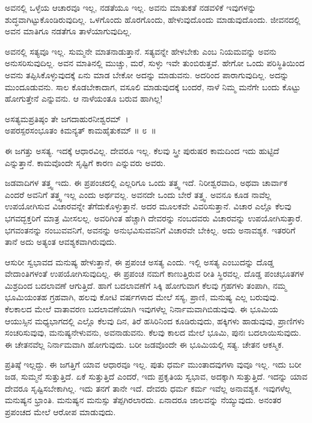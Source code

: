 ಅವನಲ್ಲಿ ಒಳ್ಳೆಯ ಆಚಾರವೂ ಇಲ್ಲ, ನಡತೆಯೂ ಇಲ್ಲ. ಅವನು ಮಾತುಕತೆ ನಡವಳಿಕೆ ಇವುಗಳನ್ನು ಶುದ್ಧವಾಗಿಟ್ಟುಕೊಂಡಿರುವುದಿಲ್ಲ. ಒಳಗೊಂದು ಹೊರಗೊಂದು, ಹೇಳುವುದೊಂದು ಮಾಡುವುದೊಂದು. ಜೀವನದಲ್ಲಿ ಅವನ ಮಾತಿಗೂ ನಡತೆಗೂ ತಾಳೆಯಾಗುವುದಿಲ್ಲ.

ಅವನಲ್ಲಿ ಸತ್ಯವೂ ಇಲ್ಲ. ಸುಮ್ಮನೇ ಮಾತನಾಡುತ್ತಾನೆ. ಸತ್ಯವನ್ನೇ ಹೇಳಬೇಕು ಎಂಬ ನಿಯಮವನ್ನು ಅವನು ಅನುಸರಿಸುವುದಿಲ್ಲ. ಅವನ ಮಾತಿನಲ್ಲಿ ಮುಚ್ಚು, ಮರೆ, ಸುಳ್ಳು ಇವೇ ತುಂಬಿರುತ್ತವೆ. ಹೇಗೋ ಒಂದು ಪರಿಸ್ಥಿತಿಯಿಂದ ಅವನು ತಪ್ಪಿಸಿಕೊಳ್ಳುವುದಕ್ಕೆ ಏನು ಮಾಡ ಬೇಕೋ ಅದನ್ನು ಮಾಡುವನು. ಅದರಿಂದ ಪಾರಾಗುವುದಿಲ್ಲ. ಅದನ್ನು ಮುಂದೂಡುವನು. ಸಾಲ ಕೊಡಬೇಕಾದಾಗ, ವಸೂಲಿ ಮಾಡುವುದಕ್ಕೆ ಬಂದರೆ, ನಾಳೆ ನಿಮ್ಮ ಮನೆಗೇ ಬಂದು ಕೊಟ್ಟು ಹೋಗುತ್ತೇನೆ ಎನ್ನುವನು. ಆ ನಾಳೆಯಂತೂ ಬರುವ ಹಾಗಿಲ್ಲ!

\begin{shloka}
ಅಸತ್ಯಮಪ್ರತಿಷ್ಠಂ ತೇ ಜಗದಾಹುರನೀಶ್ವರಮ್~।\\ಅಪರಸ್ಪರಸಂಭೂತಂ ಕಿಮನ್ಯತ್ ಕಾಮಹೈತುಕಮ್ \hfill॥ ೮~॥
\end{shloka}

\begin{artha}
ಈ ಜಗತ್ತು ಅಸತ್ಯ. ಇದಕ್ಕೆ ಆಧಾರವಿಲ್ಲ. ದೇವರೂ ಇಲ್ಲ. ಕೆಲವು ಸ್ತ್ರೀ ಪುರುಷರ ಕಾಮದಿಂದ ಇದು ಹುಟ್ಟಿದೆ ಎನ್ನುತ್ತಾನೆ. ಕಾಮವೊಂದೇ ಸೃಷ್ಟಿಗೆ ಕಾರಣ ಎನ್ನುವರು ಅವರು.
\end{artha}

ಜಡವಾದಿಗಳ ತತ್ತ್ವ ಇದು. ಈ ಪ್ರಪಂಚದಲ್ಲಿ ಎಲ್ಲರಿಗೂ ಒಂದು ತತ್ತ್ವ ಇದೆ. ನಿರೀಶ್ವರವಾದಿ, ಅಥವಾ ಚಾರ್ವಾಕ ಎಂದರೆ ಅವನಿಗೆ ತತ್ತ್ವ ಇಲ್ಲ ಎಂದು ಅರ್ಥವಲ್ಲ. ಅವನದೇ ಒಂದು ಬೇರೆ ತತ್ತ್ವ. ಅವನೂ ಕೂಡ ನಾವೆಲ್ಲ ಉಪಯೋಗಿಸುವ ವಿಚಾರವನ್ನೇ ತೆಗೆದುಕೊಳ್ಳುತ್ತಾನೆ. ಅದರ ಮೂಲಕವೇ ವಿವರಿಸುತ್ತಾನೆ. ವಿಚಾರ ಎಲ್ಲೊ ಕೆಲವು ಭಗವದ್ಭಕ್ತರಿಗೆ ಮಾತ್ರ ಮೀಸಲಲ್ಲ. ಅವರಿಗಿಂತ ಹೆಚ್ಚಾಗಿ ದೇವರನ್ನು ನಂಬದವರು ವಿಚಾರವನ್ನು ಉಪಯೋಗಿಸುತ್ತಾರೆ. ಭಗವಂತನನ್ನು ನಂಬುವವನಿಗೆ, ಅವನನ್ನು ಅನುಭವಿಸುವವನಿಗೆ ವಿಚಾರವೇ ಬೇಕಿಲ್ಲ. ಅದು ಅನಾವಶ್ಯಕ. ಇತರರಿಗೆ ತಾನೆ ಅದು ಅತ್ಯಂತ ಆವಶ್ಯಕವಾಗಿರುವುದು.

ಆಸುರೀ ಸ್ವಭಾವದ ಮನುಷ್ಯ ಹೇಳುತ್ತಾನೆ, ಈ ಪ್ರಪಂಚ ಅಸತ್ಯ ಎಂದು. ಇಲ್ಲಿ ಅಸತ್ಯ ಎಂಬುದನ್ನು ದೊಡ್ಡ ವೇದಾಂತಿಗಳಂತೆ ಉಪಯೋಗಿಸುವುದಿಲ್ಲ. ಈ ಪ್ರಪಂಚ ನಮಗೆ ಕಾಣು\-ತ್ತಿರುವ ರೀತಿ ಸ್ಥಿರವಲ್ಲ. ದೊಡ್ಡ ಪಂಚಭೂತಗಳ ಮಿಶ್ರದಿಂದ ಬದಲಾವಣೆ ಆಗುತ್ತಿದೆ. ಹಾಗೆ ಬದಲಾವಣೆಗೆ ಸಿಕ್ಕಿ ಹೋಗುವಾಗ ಕೆಲವು ಗ್ರಹಗಳು ತಂಪಾಗಿ, ನಮ್ಮ ಭೂಮಿಯಂತಹ ಗ್ರಹವಾಗಿ, ಹಲವು ಕೋಟಿ ವರ್ಷಗಳಾದ ಮೇಲೆ ಸಸ್ಯ, ಪ್ರಾಣಿ, ಮನುಷ್ಯ ಎಲ್ಲ ಬರುವುವು. ಕೆಲಕಾಲದ ಮೇಲೆ ವಾತಾವರಣ ಬದಲಾವಣೆಯಾಗಿ ಇವುಗಳೆಲ್ಲ ನಿರ್ನಾಮವಾಗಿಬಿಡುವುವು. ಈ ಭೂಮಿಯ ಆಯುಸ್ಸಿನ ಮಧ್ಯಭಾಗದಲ್ಲಿ ಎಲ್ಲೊ ಕೆಲವು ದಿನ, ತಿರೆ ಹಸಿರಿನಿಂದ ಕೂಡಿರುವುದು, ಹಕ್ಕಿಗಳು ಹಾಡುವುವು, ಪ್ರಾಣಿಗಳು ಸಂಚರಿಸುವುವು, ಮನುಷ್ಯನೇಳುವನು, ಅವನಾಡುವನು. ಕೆಲವು ಕಾಲದ ಮೇಲೆ ಭೂಮಿ, ಪುನಃ ಬದಲಾಯಿಸುವುದು. ಈ ಚೇತನವೆಲ್ಲ ನಿರ್ನಾಮವಾಗಿ ಹೋಗುವುದು. ಬರೀ ಜಡವೊಂದೇ ಈ ಭೂಮಿಯಲ್ಲಿ ಸತ್ಯ. ಚೇತನ ಆಕಸ್ಮಿಕ.

ಪ್ರತಿಷ್ಠೆ ಇಲ್ಲದ್ದು. ಈ ಜಗತ್ತಿಗೆ ಯಾವ ಆಧಾರವೂ ಇಲ್ಲ. ಪುತು ಧರ್ಮ ಮುಂತಾದವುಗಳಾ ವುವೂ ಇಲ್ಲ. ಇದು ಬರೀ ಜಡ, ಸುಮ್ಮನೆ ಸುತ್ತುತ್ತಿದೆ. ಏಕೆ ಸುತ್ತುತ್ತಿದೆ ಎಂದರೆ, ಇದು ಪ್ರಕೃತಿಯ ಸ್ವಭಾವ, ಅದಕ್ಕಾಗಿ ಸುತ್ತುತ್ತಿದೆ. ಇದನ್ನು ಯಾವ ದೇವರೂ ಸೃಷ್ಟಿಸಬೇಕಾಗಿಲ್ಲ. ಇದು ತನಗೆ ತಾನೇ ಇದೆ. ದೇವರು ಧರ್ಮ ಕರ್ಮ ಇವೆಲ್ಲ ಅನಾವಶ್ಯಕ. ಇವುಗಳೆಲ್ಲ ಮನುಷ್ಯನ ಭ್ರಾಂತಿ. ಮನುಷ್ಯನ ಮನುಸ್ಸು ತೆಪ್ಪಗಿರಲಾರದು. ಏನಾದರೂ ಜಾಲವನ್ನು ನೆಯ್ಯುವುದು. ಅನಂತರ ಪ್ರಪಂಚದ ಮೇಲೆ ಆರೋಪ ಮಾಡುವುದು.

